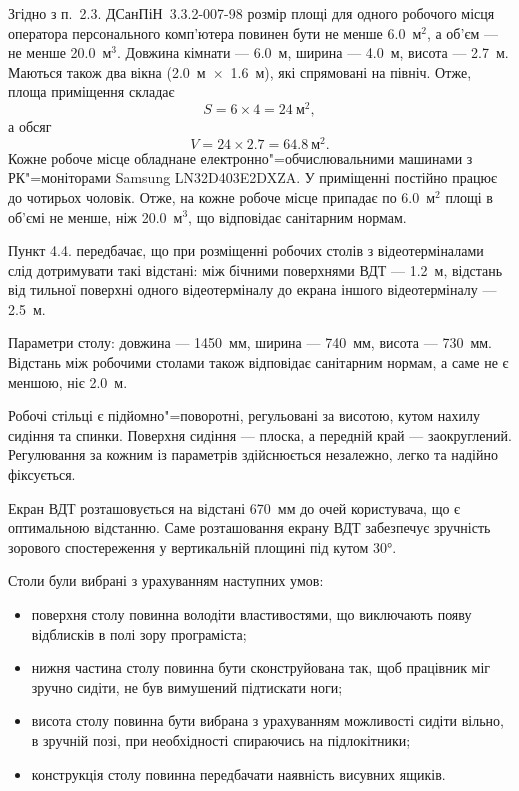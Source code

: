 \documentclass[simple,14pt,utf8,ukrainian]{eskdtext}
\begin{document}
    Згідно з п.~2.3. ДСанПіН~3.3.2-007-98 розмір площі для одного робочого
    місця оператора персонального комп’ютера повинен бути не менше
    \num{6.0}~м$^2$, а об’єм --- не менше \num{20.0}~м$^3$.
    Довжина кімнати --- \num{6.0}~м, ширина --- \num{4.0}~м, висота ---
    \num{2.7}~м.
    Маються також два вікна (\num{2.0}~м~$\times$~\num{1.6}~м), які спрямовані
    на північ.
    Отже, площа приміщення складає
      \[
        S = 6 \times 4 = 24~\text{м}^2,
      \]
    а обсяг
      \[
        V = 24 \times 2.7 = 64.8~\text{м}^2.
      \]
    Кожне робоче місце обладнане електронно"=обчислювальними машинами з
    РК"=моніторами Samsung LN32D403E2DXZA.
    У приміщенні постійно працює до чотирьох чоловік.
    Отже, на кожне робоче місце припадає по \num{6.0}~м$^2$ площі в об’ємі не
    менше, ніж \num{20.0}~м$^3$, що відповідає санітарним нормам.

    Пункт 4.4. передбачає, що при розміщенні робочих столів з відеотерміналами
    слід дотримувати такі відстані: між бічними поверхнями ВДТ ---
    \num{1.2}~м, відстань від тильної поверхні одного відеотерміналу до екрана
    іншого відеотерміналу --- \num{2.5}~м.\cite{dsanpin}

    Параметри столу: довжина --- \num{1450}~мм, ширина --- \num{740}~мм,
    висота --- \num{730}~мм.
    Відстань між робочими столами також відповідає санітарним нормам, а саме
    не є меншою, ніє \num{2.0}~м.

    Робочі стільці є підйомно"=поворотні, регульовані за висотою, кутом нахилу
    сидіння та спинки.
    Поверхня сидіння --- плоска, а передній край --- заокруглений.
    Регулювання за кожним із параметрів здійснюється незалежно, легко та
    надійно фіксується.

    Екран ВДТ розташовується на відстані \num{670}~мм до очей користувача, що
    є оптимальною відстанню.
    Саме розташовання екрану ВДТ забезпечує зручність зорового спостереження у
    вертикальній площині під кутом \ang{30}.

    Столи були вибрані з урахуванням наступних умов:
    \begin{itemize}
      \item поверхня столу повинна володіти властивостями, що виключають появу
        відблисків в полі зору програміста;
      \item нижня частина столу повинна бути сконструйована так, щоб працівник
        міг зручно сидіти, не був вимушений підтискати ноги;
      \item висота столу повинна бути вибрана з урахуванням можливості сидіти
        вільно, в зручній позі, при необхідності спираючись на підлокітники;
      \item конструкція столу повинна передбачати наявність висувних ящиків.
    \end{itemize}
\end{document}
